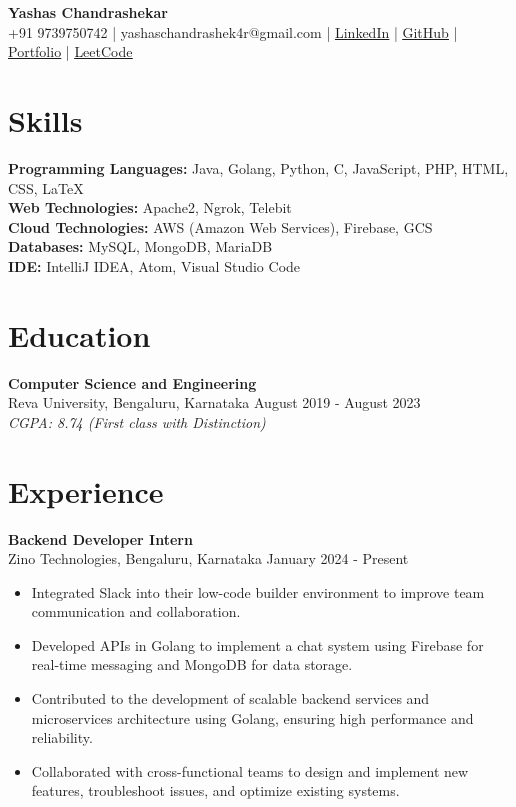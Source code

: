 \documentclass[a4paper,15pt]{article}
\begin{document}
\pagestyle{empty}

\begin{center}
    \textbf{\LARGE Yashas Chandrashekar} \\
    \vspace{2mm}
    +91 9739750742 | yashaschandrashek4r@gmail.com | \href{https://linkedin.com/in/yashaschandrashekar}{\underline{LinkedIn}} | \href{https://github.com/yashasc2k1}{\underline{GitHub}} | \href{https://yashasc2k1.github.io/YashasChandrashekar/}{\underline{Portfolio}} | \href{https://leetcode.com/YashasC/}{\underline{LeetCode}}
\end{center}

\section*{Skills}
\textbf{Programming Languages:}
Java, Golang, Python, C, JavaScript, PHP, HTML, CSS, \LaTeX \\
\textbf{Web Technologies:}
Apache2, Ngrok, Telebit \\
\textbf{Cloud Technologies:}
AWS (Amazon Web Services), Firebase, GCS \\
\textbf{Databases:}
MySQL, MongoDB, MariaDB \\
\textbf{IDE:}
IntelliJ IDEA, Atom, Visual Studio Code

\section*{Education}
\textbf{Computer Science and Engineering} \\
Reva University, Bengaluru, Karnataka \hfill August 2019 - August 2023 \\
\textit{CGPA: 8.74 (First class with Distinction)}

\section*{Experience}
\textbf{Backend Developer Intern} \\
Zino Technologies, Bengaluru, Karnataka \hfill January 2024 - Present
\begin{itemize}
    \item Integrated Slack into their low-code builder environment to improve team communication and collaboration.
    \item Developed APIs in Golang to implement a chat system using Firebase for real-time messaging and MongoDB for data storage.
    \item Contributed to the development of scalable backend services and microservices architecture using Golang, ensuring high performance and reliability.
    \item Collaborated with cross-functional teams to design and implement new features, troubleshoot issues, and optimize existing systems.
\end{itemize}
\end{document}
